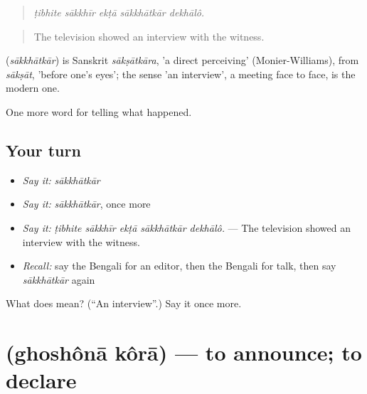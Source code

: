 \begin{quote}
    
\end{quote}

\begin{quote}
\emph{ṭibhite sākkhīr ekṭā sākkhātkār dekhālô.}
\end{quote}

\begin{quote}
The television showed an interview with the witness.
\end{quote}

\begin{cousinweb}
\textbf{} (\emph{sākkhātkār}) is Sanskrit \emph{sākṣātkāra}, 'a direct perceiving' (Monier-Williams), from \emph{sākṣāt}, 'before one's eyes'; the sense 'an interview', a meeting face to face, is the modern one.
\end{cousinweb}

\begin{grammarlens}[title={What you've built}]
One more word for telling what happened.
\end{grammarlens}

\subsection*{Your turn}
\begin{itemize}
\raggedright
  \item \emph{Say it:} \emph{sākkhātkār}
  \item \emph{Say it:} \emph{sākkhātkār}, once more
  \item \emph{Say it:} \emph{ṭibhite sākkhīr ekṭā sākkhātkār dekhālô.} — The television showed an interview with the witness.
  \item \emph{Recall:} say the Bengali for an editor, then the Bengali for talk, then say \emph{sākkhātkār} again
\end{itemize}

\begin{tcolorbox}[breakable,colback=teal!4,colframe=teal!35!black,title={Before you move on}]
What does  mean? (\textquotedblleft{}An interview\textquotedblright{}.) Say it once more.
\end{tcolorbox}
\section[\texorpdfstring{\bn{ঘোষণা} \bn{করা} (ghoshônā kôrā)}{ঘোষণা করা (ghoshônā kôrā)}]{  (ghoshônā kôrā) — to announce; to declare}

